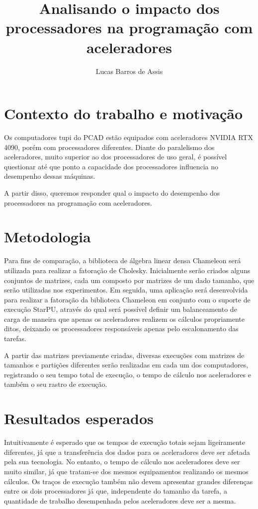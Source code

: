 \documentclass[11pt]{article}
\author{Lucas Barros de Assis}
\date{}
\title{Analisando o impacto dos processadores na programação com aceleradores}
\begin{document}
\maketitle

\section{Contexto do trabalho e motivação}
\label{sec:org59c17aa}

Os computadores tupi do PCAD estão equipados com aceleradores NVIDIA RTX 4090, porém com processadores diferentes.
Diante do paralelismo dos aceleradores, muito superior ao dos processadores de uso geral, é possível questionar até que ponto a
capacidade dos processadores influencia no desempenho dessas máquinas.

A partir disso, queremos responder qual o impacto do desempenho dos processadores na programação com aceleradores.

\section{Metodologia}
\label{sec:org2ebf95f}

Para fins de comparação, a biblioteca de álgebra linear densa Chameleon será utilizada para realizar a fatoração de Cholesky.
Inicialmente serão criados alguns conjuntos de matrizes, cada um composto por matrizes de um dado tamanho, que serão utilizadas nos experimentos.
Em seguida, uma aplicação será desenvolvida para realizar a fatoração da biblioteca Chameleon em conjunto com o suporte de
execução StarPU, através do qual será possível definir um balanceamento de carga de maneira que apenas os aceleradores
realizem os cálculos propriamente ditos, deixando os processadores responsáveis apenas pelo escalonamento das tarefas.

A partir das matrizes previamente criadas, diversas execuções com matrizes de tamanhos e partições diferentes serão realizadas em cada um dos computadores,
registrando o seu tempo total de execução, o tempo de cálculo nos aceleradores e também o seu rastro de execução.

\section{Resultados esperados}
\label{sec:org64397c2}

Intuitivamente é esperado que os tempos de execução totais sejam ligeiramente diferentes, já que a transferência dos dados para os aceleradores deve ser
afetada pela sua tecnologia. No entanto, o tempo de cálculo nos aceleradores deve ser muito similar, já que tratam-se dos mesmos equipamentos realizando
os mesmos cálculos. Os traços de execução também não devem apresentar grandes diferenças entre os dois processadores já que, independente do tamanho
da tarefa, a quantidade de trabalho desempenhada pelos aceleradores deve ser a mesma.
\end{document}
